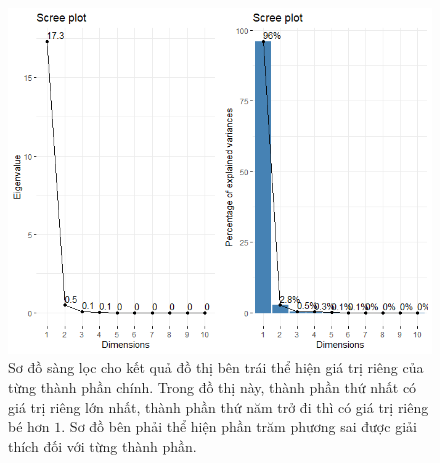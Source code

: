 \documentclass[../thesis.tex]{subfiles}
\begin{document}
\newpage
\begin{Shaded}
	\begin{Highlighting}[]
\OtherTok{\textless{}{-}}\SpecialCharTok{::} \NormalTok{)}
\OtherTok{\textless{}{-}}\SpecialCharTok{\%\textgreater{}\%}\SpecialCharTok{::}
		 \NormalTok{,}
		 \NormalTok{,}
		 \NormalTok{,}
		 \NormalTok{)}
\OtherTok{\textless{}{-}}\SpecialCharTok{\%\textgreater{}\%}\SpecialCharTok{::}
		 \NormalTok{,}
		 \NormalTok{)}
\SpecialCharTok{::} \NormalTok{)}
	\end{Highlighting}
\end{Shaded}
\begin{figure}[H]
	\centering
	\includegraphics[width=1\linewidth]{images/Scree_plot_2_cul}
	\caption[Sơ đồ sàng lọc dữ liệu ca nhiễm hằng ngày và giá trị riêng tương ứng]{Sơ đồ sàng lọc cho kết quả đồ thị bên trái thể hiện giá trị riêng của từng thành phần chính. Trong đồ thị này, thành phần thứ nhất có giá trị riêng lớn nhất, thành phần thứ năm trở đi thì có giá trị riêng bé hơn $ 1 $. Sơ đồ bên phải thể hiện phần trăm phương sai được giải thích đối với từng thành phần. }
	\label{fig:screeplot2cul}
\end{figure}
\end{document}
